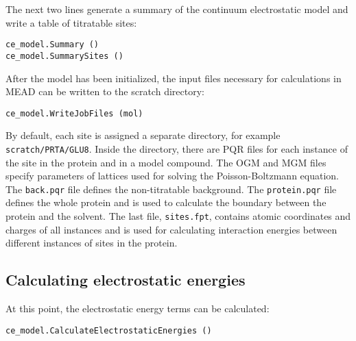 \documentclass[a4paper,11pt]{article}
\begin{document}
\bigskip
The next two lines generate a summary of the continuum electrostatic model and
write a table of titratable sites:

{\footnotesize \begin{lstlisting}
ce_model.Summary ()
ce_model.SummarySites ()
\end{lstlisting} }

\bigskip
After the model has been initialized, the input files necessary for calculations in MEAD
can be written to the scratch directory:

{\footnotesize \begin{lstlisting}
ce_model.WriteJobFiles (mol)
\end{lstlisting} }

By default, each site is assigned a separate directory, for example
\texttt{scratch/PRTA/GLU8}.
%
Inside the directory, there are PQR files for each instance of the site in the protein
and in a model compound.
%
The OGM and MGM files specify parameters of lattices used for solving the Poisson-Boltzmann equation.
%
The \texttt{back.pqr} file defines the non-titratable background.
%
The \texttt{protein.pqr} file defines the whole protein and is used to calculate the boundary
between the protein and the solvent.
%
The last file, \texttt{sites.fpt}, contains atomic coordinates and charges of all instances
and is used for calculating interaction energies between
different instances of sites in the protein.


\subsection{Calculating electrostatic energies}
At this point, the electrostatic energy terms can be calculated:

{\footnotesize \begin{lstlisting}
ce_model.CalculateElectrostaticEnergies ()
\end{lstlisting} }
\end{document}
